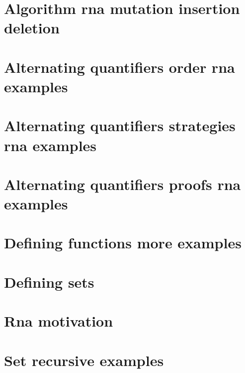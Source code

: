 
\section*{Algorithm rna mutation insertion deletion}

\vfill
\section*{Alternating quantifiers order rna examples}

\vfill
\section*{Alternating quantifiers strategies rna examples}

\vfill
\section*{Alternating quantifiers proofs rna examples}

\vfill
\section*{Defining functions more examples}

\vfill
\section*{Defining sets}

\vfill
\section*{Rna motivation}

\vfill
\section*{Set recursive examples}

\vfill
